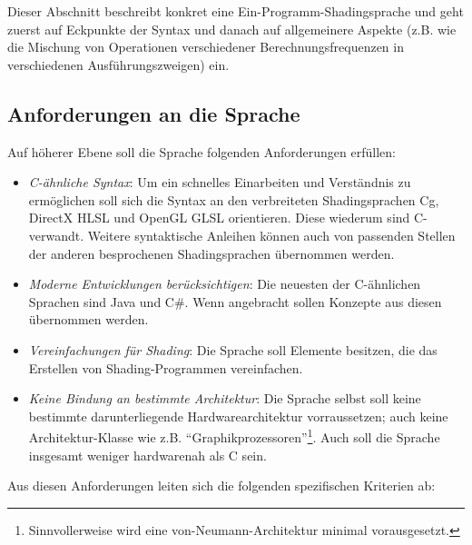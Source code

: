 Dieser Abschnitt beschreibt konkret eine Ein-Programm-Shadingsprache und geht zuerst auf Eckpunkte der Syntax und danach
auf allgemeinere Aspekte (z.B. wie die Mischung von Operationen verschiedener Berechnungsfrequenzen in verschiedenen Ausführungszweigen) ein.

\subsection{Anforderungen an die Sprache}

Auf höherer Ebene soll die Sprache folgenden Anforderungen erfüllen:
\begin{itemize}
\item \emph{C-ähnliche Syntax}: Um ein schnelles Einarbeiten und Verständnis zu ermöglichen soll sich die Syntax an den verbreiteten
Shadingsprachen Cg, DirectX HLSL und OpenGL GLSL orientieren. Diese wiederum sind C-verwandt.
Weitere syntaktische Anleihen können auch von passenden Stellen der anderen besprochenen  Shadingsprachen übernommen werden.
\item \emph{Moderne Entwicklungen berücksichtigen}: Die neuesten der C-ähnlichen Sprachen sind Java und C\#. Wenn angebracht sollen
Konzepte aus diesen übernommen werden.
\item \emph{Vereinfachungen für Shading}: Die Sprache soll Elemente besitzen, die das Erstellen von Shading-Programmen
vereinfachen. \item \emph{Keine Bindung an bestimmte Architektur}: Die Sprache selbst soll keine bestimmte darunterliegende Hardwarearchitektur
vorraussetzen; auch keine Architektur-Klasse wie z.B. "`Graphikprozessoren"'\footnote{Sinnvollerweise wird eine von-Neumann-Architektur minimal vorausgesetzt.}.
Auch soll die Sprache insgesamt weniger hardwarenah als C sein.
\end{itemize}


Aus diesen Anforderungen leiten sich die folgenden spezifischen Kriterien ab:

